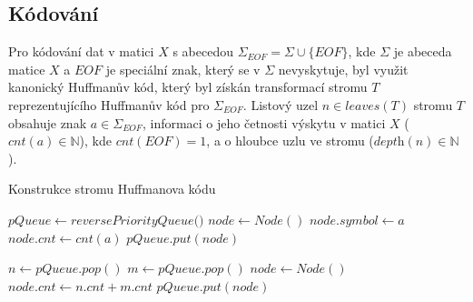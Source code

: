 \documentclass[a4paper, 11pt, fleqn]{scrartcl}
\begin{document}
      \subsection{Kódování}
        Pro kódování dat v matici $X$ s abecedou $\Sigma_{EOF} = \Sigma \cup \{\textit{EOF}\}$, kde $\Sigma$ je abeceda matice $X$ a $\textit{EOF}$ je speciální znak, který se v $\Sigma$ nevyskytuje, byl využit kanonický Huffmanův kód, který byl získán transformací stromu $T$ reprezentujícího Huffmanův kód pro $\Sigma_{EOF}$. Listový uzel $n \in leaves(T)$ stromu $T$ obsahuje znak $a \in \Sigma_{EOF}$, informaci o jeho četnosti výskytu v matici $X$ ($cnt(a) \in \mathbb{N}$), kde $cnt(\textit{EOF}) = 1$, a o hloubce uzlu ve stromu ($\textit{depth}(n) \in \mathbb{N}$).

        \begin{algorithm}[!h]
          \SetAlgoLined
          \DontPrintSemicolon
          \caption{Konstrukce stromu Huffmanova kódu}

          \vspace*{2mm}

          $pQueue \leftarrow \textit{reversePriorityQueue()}$ 
          {
            $node \leftarrow Node()$
            $node.symbol \leftarrow a$\;
            $node.cnt \leftarrow cnt(a)$\;
            $pQueue.put(node)$\;
          }

          \vspace*{1mm}

          {
            $n \leftarrow pQueue.pop()$\;
            $m \leftarrow pQueue.pop()$\;
            $node \leftarrow Node()$
            $node.cnt \leftarrow n.cnt + m.cnt$\;
            $pQueue.put(node)$\;
          }


        \end{algorithm}

        \newpage

        \enlargethispage{1\baselineskip}
\end{document}
